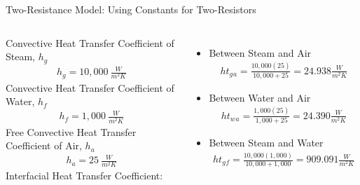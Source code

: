 \begin{frame}{Two-Resistance Model: Using Constants for Two-Resistors}
\begin{columns}
Convective Heat Transfer Coefficient of Steam, $h_g$\cite{brucker1977direct,kosky2015exploring} 
\begin{align*}
    h_g = 10,000\:\frac{W}{m^{2}K}
\end{align*}
Convective Heat Transfer Coefficient of Water, $h_f$ \cite{kosky2015exploring,EngineeringToolbox}
\begin{align*}
    h_f = 1,000\:\frac{W}{m^{2}K}
\end{align*}
Free Convective Heat Transfer Coefficient of Air, $h_a$ \cite{kosky2015exploring}
\begin{align*}
    h_a = 25\:\frac{W}{m^{2}K}
\end{align*}
Interfacial Heat Transfer Coefficient: 
\begin{itemize}
    \item Between Steam and Air
    \begin{align*}
        ht_g{}_a = \frac{10,000(25)}{10,000 + 25} = 24.938\frac{W}{m^{2}K}
    \end{align*}
    \item Between Water and Air
    \begin{align*}
        ht_w{}_a = \frac{1,000(25)}{1,000 + 25} = 24.390\frac{W}{m^{2}K}
    \end{align*}
    \item Between Steam and Water
    \begin{align*}
        ht_g{}_f = \frac{10,000(1,000)}{10,000 + 1,000} = 909.091\frac{W}{m^{2}K}
    \end{align*}
\end{itemize}
\end{columns}
\end{frame}

